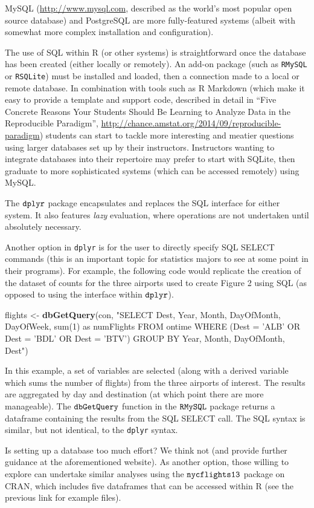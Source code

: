 \documentclass[]{article}
\newenvironment{Shaded}{\begin{snugshade}}{\end{snugshade}}
\newcommand{\KeywordTok}[1]{\textcolor[rgb]{0.13,0.29,0.53}{\textbf{{#1}}}}
\newcommand{\StringTok}[1]{\textcolor[rgb]{0.31,0.60,0.02}{{#1}}}
\newcommand{\NormalTok}[1]{{#1}}
\begin{document}
MySQL (\url{http://www.mysql.com}, described as the world's most popular
open source database) and PostgreSQL are more fully-featured systems
(albeit with somewhat more complex installation and configuration).

The use of SQL within R (or other systems) is straightforward once the
database has been created (either locally or remotely). An add-on
package (such as \texttt{RMySQL} or \texttt{RSQLite}) must be installed
and loaded, then a connection made to a local or remote database. In
combination with tools such as R Markdown (which make it easy to provide
a template and support code, described in detail in ``Five Concrete
Reasons Your Students Should Be Learning to Analyze Data in the
Reproducible Paradigm'',
\url{http://chance.amstat.org/2014/09/reproducible-paradigm}) students
can start to tackle more interesting and meatier questions using larger
databases set up by their instructors. Instructors wanting to integrate
databases into their repertoire may prefer to start with SQLite, then
graduate to more sophisticated systems (which can be accessed remotely)
using MySQL.

The ${\tt dplyr}$ package encapsulates and replaces the SQL interface
for either system. It also features \emph{lazy} evaluation, where
operations are not undertaken until absolutely necessary.

Another option in \texttt{dplyr} is for the user to directly specify SQL
SELECT commands (this is an important topic for statistics majors to see
at some point in their programs). For example, the following code would
replicate the creation of the dataset of counts for the three airports
used to create Figure 2 using SQL (as opposed to using the interface
within ${\tt dplyr}$).

\begin{Shaded}
\begin{Highlighting}[]
\NormalTok{flights <-}\StringTok{ }
\StringTok{  }\KeywordTok{dbGetQuery}\NormalTok{(con, }\StringTok{"SELECT Dest, Year, Month, DayOfMonth, DayOfWeek, sum(1) as numFlights}
\StringTok{    FROM ontime WHERE (Dest = 'ALB' OR Dest = 'BDL' OR Dest = 'BTV') }
\StringTok{    GROUP BY Year, Month, DayOfMonth, Dest"}\NormalTok{)}
\end{Highlighting}
\end{Shaded}

In this example, a set of variables are selected (along with a derived
variable which sums the number of flights) from the three airports of
interest. The results are aggregated by day and destination (at which
point there are more manageable). The ${\tt dbGetQuery}$ function in the
${\tt RMySQL}$ package returns a dataframe containing the results from
the SQL SELECT call. The SQL syntax is similar, but not identical, to
the \texttt{dplyr} syntax.

Is setting up a database too much effort? We think not (and provide
further guidance at the aforementioned website). As another option,
those willing to explore can undertake similar analyses using the
${\tt nycflights13}$ package on CRAN, which includes five dataframes
that can be accessed within R (see the previous link for example files).
\end{document}
